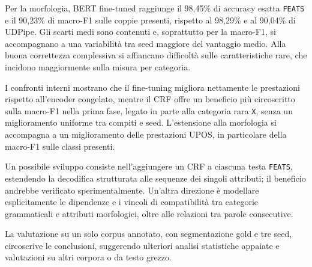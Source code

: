 \documentclass[12pt,a4paper]{report}
\begin{document}
Per la morfologia, BERT fine-tuned raggiunge il 98,45\% di accuracy esatta \texttt{FEATS} e il 90,23\% di macro-F1 sulle coppie presenti, rispetto al 98,29\% e al 90,04\% di UDPipe. Gli scarti medi sono contenuti e, soprattutto per la macro-F1, si accompagnano a una variabilità tra seed maggiore del vantaggio medio. Alla buona correttezza complessiva si affiancano difficoltà sulle caratteristiche rare, che incidono maggiormente sulla misura per categoria.

I confronti interni mostrano che il fine-tuning migliora nettamente le prestazioni rispetto all'encoder congelato, mentre il CRF offre un beneficio più circoscritto sulla macro-F1 nella prima fase, legato in parte alla categoria rara \texttt{X}, senza un miglioramento uniforme tra compiti e seed. L'estensione alla morfologia si accompagna a un miglioramento delle prestazioni UPOS, in particolare della macro-F1 sulle classi presenti.

Un possibile sviluppo consiste nell'aggiungere un CRF a ciascuna testa \texttt{FEATS}, estendendo la decodifica strutturata alle sequenze dei singoli attributi; il beneficio andrebbe verificato sperimentalmente. Un'altra direzione è modellare esplicitamente le dipendenze e i vincoli di compatibilità tra categorie grammaticali e attributi morfologici, oltre alle relazioni tra parole consecutive.

La valutazione su un solo corpus annotato, con segmentazione gold e tre seed, circoscrive le conclusioni, suggerendo ulteriori analisi statistiche appaiate e valutazioni su altri corpora o da testo grezzo.

\clearpage
{}
{}

{\footnotesize\raggedright
\setlength{\parskip}{0pt}

}
\end{document}
